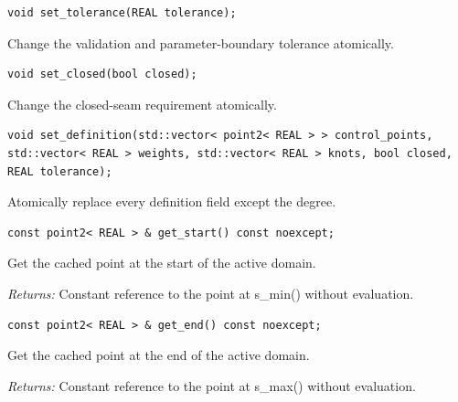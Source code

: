 \par\noindent\begin{minipage}{\linewidth}
\begin{lstlisting}[style=apireference]
void set_tolerance(REAL tolerance);
\end{lstlisting}
{\footnotesize Change the validation and parameter-boundary tolerance atomically.\par}
\end{minipage}\par\vspace{1pt}
\par\noindent\begin{minipage}{\linewidth}
\begin{lstlisting}[style=apireference]
void set_closed(bool closed);
\end{lstlisting}
{\footnotesize Change the closed-seam requirement atomically.\par}
\end{minipage}\par\vspace{1pt}
\par\noindent\begin{minipage}{\linewidth}
\begin{lstlisting}[style=apireference]
void set_definition(std::vector< point2< REAL > > control_points, std::vector< REAL > weights, std::vector< REAL > knots, bool closed, REAL tolerance);
\end{lstlisting}
{\footnotesize Atomically replace every definition field except the degree.\par}
\end{minipage}\par\vspace{1pt}
\par\noindent\begin{minipage}{\linewidth}
\begin{lstlisting}[style=apireference]
const point2< REAL > & get_start() const noexcept;
\end{lstlisting}
{\footnotesize Get the cached point at the start of the active domain.\par}
{\footnotesize\textit{Returns:} Constant reference to the point at s\_min() without evaluation.\par}
\end{minipage}\par\vspace{1pt}
\par\noindent\begin{minipage}{\linewidth}
\begin{lstlisting}[style=apireference]
const point2< REAL > & get_end() const noexcept;
\end{lstlisting}
{\footnotesize Get the cached point at the end of the active domain.\par}
{\footnotesize\textit{Returns:} Constant reference to the point at s\_max() without evaluation.\par}
\end{minipage}\par\vspace{1pt}
